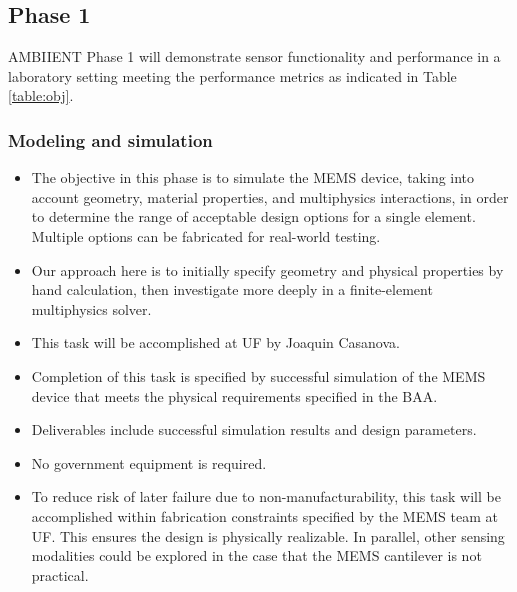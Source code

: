 \subsection{Phase 1}

AMBIIENT Phase 1 will demonstrate sensor functionality and performance in a laboratory
setting meeting the performance metrics as indicated in Table \ref{table:obj}. 

\subsubsection{Modeling and simulation}\label{sec:p1:em}
\begin{itemize}
\item The objective in this phase is to simulate the MEMS device, taking into account geometry, material properties, and multiphysics interactions, in order to determine the range of acceptable design options for a single element. Multiple options can be fabricated for real-world testing. 
\item Our approach here is to initially specify geometry and physical properties by hand calculation, then investigate more deeply in a finite-element multiphysics solver.
\item This task will be accomplished at UF by Joaquin Casanova.
\item Completion of this task is specified by successful simulation of the MEMS device that meets the physical requirements specified in the BAA.
\item Deliverables include successful simulation results and design parameters.
\item No government equipment is required.
\item To reduce risk of later failure due to non-manufacturability, this task will be accomplished within fabrication constraints specified by the MEMS team at UF. This ensures the design is physically realizable. In parallel, other sensing modalities could be explored in the case that the MEMS cantilever is not practical.
\end{itemize}
